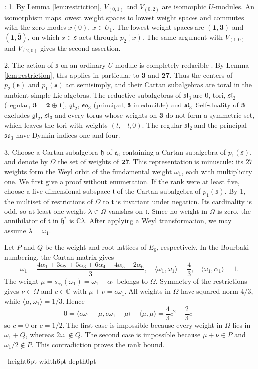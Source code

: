 \documentclass[leqno]{article}
\newcommand{\Cbb}{\ensuremath{\mathbb{C}}}
\newcommand{\qed}{\hfill \vrule height6pt  width6pt depth0pt}
\newenvironment{proof}[1][]{\noindent {\it Proof #1} : }{\hbox{~}\qed
\smallskip
}
\numberwithin{equation}{section}
\begin{document}
\begin{proof}
1. By Lemma \ref{lem:restriction}, $V_{(0,1)}$ and $V_{(0,2)}$ are isomorphic $U$-modules. An isomorphism maps lowest weight spaces to lowest weight spaces and commutes with the zero modes $x(0)$, $x \in U_1$. The lowest weight spaces are $(\mathbf 1,\mathbf 3)$ and $(\mathbf 1,\overline{\mathbf 3})$, on which $x \in \mathfrak s$ acts through $p_2(x)$. The same argument with $V_{(1,0)}$ and $V_{(2,0)}$ gives the second assertion.

2. The action of $\mathfrak s$ on an ordinary $U$-module is completely reducible \cite[Theorem 1 p.~2]{DoM04}. By Lemma \ref{lem:restriction}, this applies in particular to $\mathbf3$ and $\mathbf{27}$. Thus the centers of $p_2(\mathfrak s)$ and $p_1(\mathfrak s)$ act semisimply, and their Cartan subalgebras are toral in the ambient simple Lie algebras. The reductive subalgebras of $\mathfrak{sl}_3$ are $0$, tori, $\mathfrak{sl}_2$ (regular, $\mathbf 3 = \mathbf 2 \oplus \mathbf 1$), $\mathfrak{gl}_2$, $\mathfrak{so}_3$ (principal, $\mathbf 3$ irreducible) and $\mathfrak{sl}_3$. Self-duality of $\mathbf 3$ excludes $\mathfrak{gl}_2$, $\mathfrak{sl}_3$ and every torus whose weights on $\mathbf 3$ do not form a symmetric set, which leaves the tori with weights $(t,-t,0)$. The regular $\mathfrak{sl}_2$ and the principal $\mathfrak{so}_3$ have Dynkin indices one and four.

3. Choose a Cartan subalgebra $\mathfrak h$ of $\mathfrak e_6$ containing a Cartan subalgebra of $p_1(\mathfrak s)$, and denote by $\Omega$ the set of weights of $\mathbf{27}$. This representation is minuscule: its $27$ weights form the Weyl orbit of the fundamental weight $\omega_1$, each with multiplicity one. We first give a proof without enumeration. If the rank were at least five, choose a five-dimensional subspace $\mathfrak t$ of the Cartan subalgebra of $p_1(\mathfrak s)$. By 1, the multiset of restrictions of $\Omega$ to $\mathfrak t$ is invariant under negation. Its cardinality is odd, so at least one weight $\lambda \in \Omega$ vanishes on $\mathfrak t$. Since no weight in $\Omega$ is zero, the annihilator of $\mathfrak t$ in $\mathfrak h^*$ is $\Cbb\lambda$. After applying a Weyl transformation, we may assume $\lambda = \omega_1$.

Let $P$ and $Q$ be the weight and root lattices of $E_6$, respectively. In the Bourbaki numbering, the Cartan matrix gives
\[
\omega_1 = \frac{4\alpha_1+3\alpha_2+5\alpha_3+6\alpha_4+4\alpha_5+2\alpha_6}{3},\quad
\langle\omega_1,\omega_1\rangle = \frac43,\quad
\langle\omega_1,\alpha_1\rangle = 1.
\]
The weight $\mu = s_{\alpha_1}(\omega_1) = \omega_1-\alpha_1$ belongs to $\Omega$. Symmetry of the restrictions gives $\nu \in \Omega$ and $c \in \Cbb$ with $\mu+\nu = c\omega_1$. All weights in $\Omega$ have squared norm $4/3$, while $\langle\mu,\omega_1\rangle = 1/3$. Hence
\[
0 = \langle c\omega_1-\mu,c\omega_1-\mu\rangle-\langle\mu,\mu\rangle
= \frac43c^2-\frac23c,
\]
so $c = 0$ or $c = 1/2$. The first case is impossible because every weight in $\Omega$ lies in $\omega_1+Q$, whereas $2\omega_1 \notin Q$. The second case is impossible because $\mu+\nu \in P$ and $\omega_1/2 \notin P$. This contradiction proves the rank bound.


\end{proof}
\end{document}

